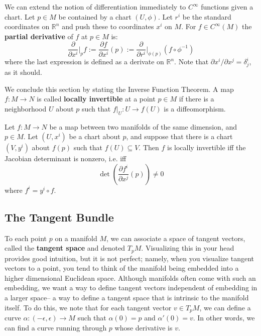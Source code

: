 We can extend the notion of differentiation immediately to $C^\infty$ functions given a chart. Let $p\in M$ be contained by 
a chart $(U, \phi)$. Let $r^i$ be the standard coordinates on $\mathbb R^n$ and push these to coordinates $x^i$ on $M$. For
$f\in C^\infty(M)$ the \textbf{partial derivative} of $f$ at $p\in M$ is:
\begin{equation}
	\frac{\partial}{\partial x^i}\bigg|_p f := \frac{\partial f}{\partial x^i}(p) := \frac{\partial}{\partial r^i}\bigg|_{\phi(p)} (f\circ\phi^{-1})
\end{equation}
where the last expression is defined as a derivate on $\mathbb R^n$. Note that $\partial x^i / \partial x^j = \delta^i_j$, as it 
should. 

We conclude this section by stating the Inverse Function Theorem. A map $f : M\rightarrow N$ is called \textbf{locally 
invertible} at a point $p\in M$ if there is a neighborhood $U$ about $p$ such that $f|_U : U\rightarrow f(U)$ is a 
diffeomorphism. 
\begin{theorem}
	Let $f : M\rightarrow N$ be a map between two manifolds of the same dimension, and $p\in M$. Let $(U, x^i)$ be a 
	chart about $p$, and suppose that there is a chart $(V, y^i)$ about $f(p)$ such that $f(U)\subseteq V$. Then $f$ is 
	locally invertible iff the Jacobian determinant is nonzero, i.e. iff
	\begin{equation}
		\det\left(\frac{\partial f^i}{\partial x^j}(p)\right)\neq 0
	\end{equation}
	where $f^i = y^i\circ f$. 
\end{theorem}

\subsection{The Tangent Bundle}

To each point $p$ on a manifold $M$, we can associate a space of tangent vectors, called the \textbf{tangent space} 
and denoted $T_p M$. Visualizing this in your head provides good intuition, but it is not perfect; namely, when you 
visualize tangent vectors to a point, you tend to think of the manifold being embedded into a higher dimensional Euclidean 
space. Although manifolds often come with such an embedding, we want a way to define tangent vectors independent of 
embedding in a larger space-- a way to define a tangent space that is intrinsic to the manifold itself. To do this, we note 
that for each tangent vector $v\in T_p M$, we can define a curve $\alpha : (-\epsilon, \epsilon)\rightarrow M$ such that 
$\alpha(0) = p$ and $\alpha'(0) = v$. In other words, we can find a curve running through $p$ whose derivative is $v$. 


